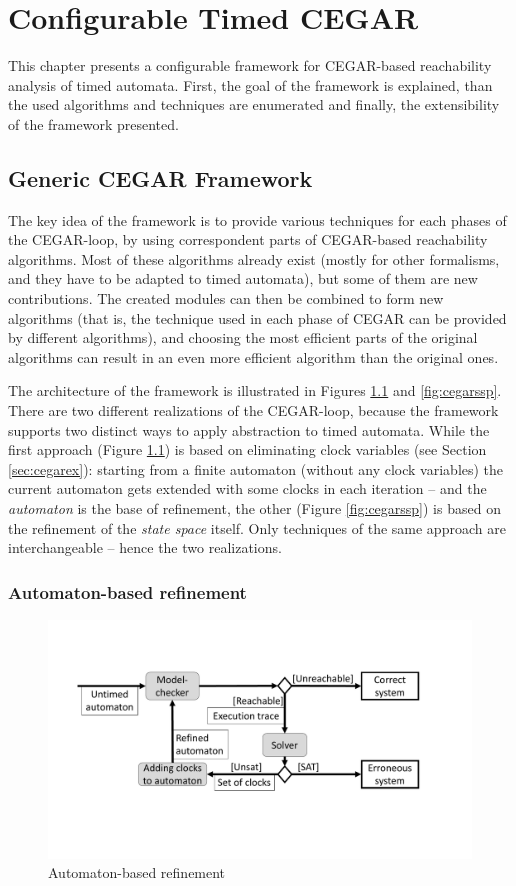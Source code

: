 \chapter{Configurable Timed CEGAR} \label{chap:timed_cegar}

This chapter presents a configurable framework for CEGAR-based reachability analysis of timed automata. First, the goal of the framework is explained, than the used algorithms and techniques are enumerated and finally, the extensibility of the framework presented. 

\section{Generic CEGAR Framework}

The key idea of the framework is to provide various techniques for each phases of the CEGAR-loop, by using correspondent parts of CEGAR-based reachability algorithms. Most of these algorithms already exist (mostly for other formalisms, and they have to be adapted to timed automata), but some of them are new contributions. The created modules can then be combined to form new algorithms (that is, the technique used in each phase of CEGAR can be provided by different algorithms), and choosing the most efficient parts of the original algorithms can result in an even more efficient algorithm than the original ones. 

The architecture of the framework is illustrated in Figures \ref{fig:cegaraut} and \ref{fig:cegarssp}. There are two different realizations of the CEGAR-loop, because the framework supports two distinct ways to apply abstraction to timed automata. While the first approach (Figure \ref{fig:cegaraut}) is based on eliminating clock variables (see Section \ref{sec:cegarex}):  starting from a finite automaton (without any clock variables) the current automaton gets extended with some clocks in each iteration -- and the \emph{automaton} is the base of refinement, the other (Figure \ref{fig:cegarssp}) is based on the refinement of the \emph{state space} itself. Only techniques of the same approach are interchangeable -- hence the two realizations.

\subsection{Automaton-based refinement}

\begin{figure} 
	\centering
	\includegraphics[width=.7\textwidth]{include/figures/alg_arch_ta}%
	\caption{Automaton-based refinement}%
	\label{fig:cegaraut}%
\end{figure}

